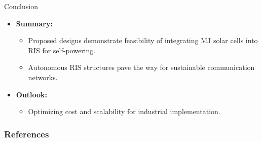 \documentclass{beamer}
\let\olditem\item
\renewcommand\item{\olditem\justifying}
\begin{document}
	\begin{frame}{Conclusion}
		\begin{itemize}
			\item \textbf{Summary:}
			\begin{itemize}
				\item Proposed designs demonstrate feasibility of integrating {MJ} solar cells into {RIS} for self-powering.
				\item Autonomous {RIS} structures pave the way for sustainable communication networks.
			\end{itemize}
			\item \textbf{Outlook:}
			\begin{itemize}
				\item Optimizing cost and scalability for industrial implementation.
			\end{itemize}
		\end{itemize}
	\end{frame}
	
	
	
	
	
	\begin{frame}[allowframebreaks]
		\frametitle{References}
		\printbibliography
	\end{frame}
	
	
\end{document}
